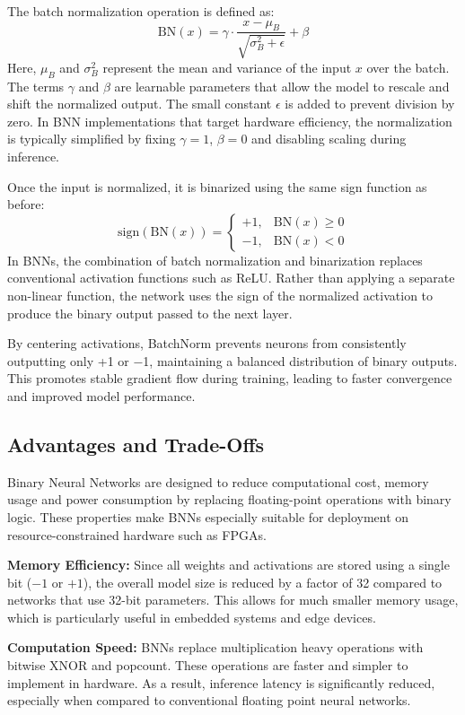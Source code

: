 \documentclass[a4paper,12pt]{report}
\begin{document}
The batch normalization operation is defined as:
\[\text{BN}(x) = \gamma \cdot \frac{x - \mu_B}{\sqrt{\sigma_B^2 + \epsilon}} + \beta\]
Here, \( \mu_B \) and \( \sigma_B^2 \) represent the mean and variance of the input \(x\) over the batch. The terms \( \gamma \) and \( \beta \) are learnable parameters that allow the model to rescale and shift the normalized output. The small constant \( \epsilon \) is added to prevent division by zero. In BNN implementations that target hardware efficiency, the normalization is typically simplified by fixing \( \gamma = 1 \), \( \beta = 0 \) and disabling scaling during inference.

Once the input is normalized, it is binarized using the same sign function as before:
\[\text{sign}(\text{BN}(x)) = 
\begin{cases}
+1, & \text{BN}(x) \geq 0 \\
-1, & \text{BN}(x) < 0
\end{cases}\]
In BNNs, the combination of batch normalization and binarization replaces conventional activation functions such as ReLU. Rather than applying a separate non-linear function, the network uses the sign of the normalized activation to produce the binary output passed to the next layer.

By centering activations, BatchNorm prevents neurons from consistently outputting only +1 or −1, maintaining a balanced distribution of binary outputs. This promotes stable gradient flow during training, leading to faster convergence and improved model performance.


\clearpage
\subsection{Advantages and Trade-Offs}
Binary Neural Networks are designed to reduce computational cost, memory usage and power consumption by replacing floating-point operations with binary logic. These properties make BNNs especially suitable for deployment on resource-constrained hardware such as FPGAs.

\noindent\textbf{Memory Efficiency:} Since all weights and activations are stored using a single bit (\(-1\) or \(+1\)), the overall model size is reduced by a factor of 32 compared to networks that use 32-bit parameters. This allows for much smaller memory usage, which is particularly useful in embedded systems and edge devices.

\noindent\textbf{Computation Speed:} BNNs replace multiplication heavy operations with bitwise XNOR and popcount. These operations are faster and simpler to implement in hardware. As a result, inference latency is significantly reduced, especially when compared to conventional floating point neural networks.
\end{document}
